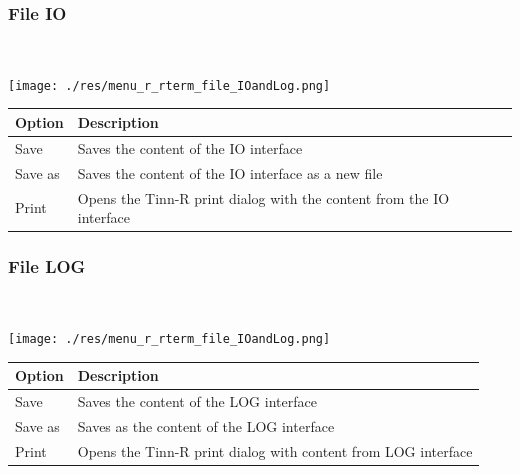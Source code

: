 \hypertarget{menu_r_rterm_file_IO}{}
\subsubsection{File IO}\\

\texttt{[image: ./res/menu\_r\_rterm\_file\_IOandLog.png]}\\

\begin{scriptsize}
  \begin{tabularx}{\textwidth}{>{\hsize=0.3\hsize}X>{\hsize=0.7\hsize}X}\\
    \hline
    \textbf{Option} & \textbf{Description} \\
    \hline
    Save & Saves the content of the IO interface \\
    Save as & Saves the content of the IO interface as a new file \\
    Print & Opens the Tinn-R print dialog with the content from the IO interface \\
    \hline
  \end{tabularx}
\end{scriptsize}


\newpage
\hypertarget{menu_r_rterm_file_Log}{}
\subsubsection{File LOG}\\

\texttt{[image: ./res/menu\_r\_rterm\_file\_IOandLog.png]}\\

\begin{scriptsize}
  \begin{tabularx}{\textwidth}{>{\hsize=0.3\hsize}X>{\hsize=0.7\hsize}X}\\
    \hline
    \textbf{Option} & \textbf{Description} \\
    \hline
    Save & Saves the content of the LOG interface \\
    Save as & Saves as the content of the LOG interface \\
    Print & Opens the Tinn-R print dialog with content from LOG interface \\
    \hline
  \end{tabularx}
\end{scriptsize}


\hypertarget{menu_r_rterm_clear}{}
